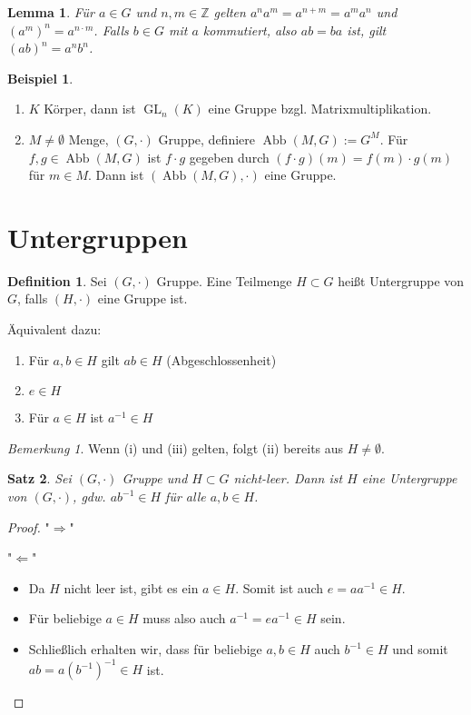 \documentclass[12pt]{scrartcl} %
\DeclareMathOperator{\GL}{GL}
\DeclareMathOperator{\abb}{Abb}
\newcommand{\Inv}[1]{#1^{-1}}
\newtheorem{thm}{Satz}[section]
\newtheorem{lemma}[thm]{Lemma}
\theoremstyle{definition}
\newtheorem*{defn}{Definition}
\newtheorem{ex}{Beispiel}
\theoremstyle{remark}
\newtheorem*{nb}{Bemerkung}
\begin{document}
\begin{lemma}
	Für $a\in G$ und \(n, m \in\mathbb Z\) gelten $a^n a^m=a^{n+m}=a^m a^n$ und $\left(a^m \right)^n = a^{n\cdot m}$.
	Falls \(b \in G\) mit \(a\) kommutiert, also $ab=ba$ ist, gilt $\left(ab \right)^n = a^n b^n$.
\end{lemma}

\begin{ex}
	\begin{enumerate}
	\item $K$ Körper, dann ist $\GL_n(K)$ eine Gruppe bzgl. Matrixmultiplikation.
	\item $M\neq \emptyset$ Menge, $(G, \cdot)$ Gruppe, definiere $\abb(M,G):=G^M$.
		Für $f,g\in \abb(M,G)$ ist $f\cdot g$ gegeben durch $(f\cdot g)(m)=f(m)\cdot g(m)$ für $m\in M$.
		Dann ist $(\abb(M,G), \cdot)$ eine Gruppe.
	\end{enumerate}
\end{ex}

\section{Untergruppen}

\begin{defn}
	Sei $(G, \cdot)$ Gruppe.
	Eine Teilmenge $H\subset G$ heißt Untergruppe von $G$, falls $(H, \cdot)$ eine Gruppe ist.

	Äquivalent dazu:
	\begin{enumerate}[label=(\roman*)]
	\item Für $a,b\in H$ gilt $ab\in H$ (Abgeschlossenheit)
	\item $e\in H$
	\item Für $a\in H$ ist $\Inv a \in H$
	\end{enumerate}
\end{defn}

\begin{nb}
	Wenn (i) und (iii) gelten, folgt (ii) bereits aus \(H \neq \emptyset\).
\end{nb}

\begin{thm}
	Sei $(G, \cdot)$ Gruppe und $H\subset G$ nicht-leer.
	Dann ist $H$ eine Untergruppe von $(G, \cdot)$, gdw. $a\Inv b\in H$ für alle $a,b\in H$.
\end{thm}

\begin{proof}
	"$\Rightarrow$" \checkmark

	"$\Leftarrow$"
	\begin{itemize}
	\item Da \(H\) nicht leer ist, gibt es ein \(a \in H\).
		Somit ist auch $e = aa^{-1}\in H$.
	\item Für beliebige \(a \in H\) muss also auch \(a^{-1} = ea^{-1} \in H\) sein.
	\item Schließlich erhalten wir, dass für beliebige \(a, b \in H\) auch \(b^{-1} \in H\) und somit \(ab = a(b^{-1})^{-1} \in H\) ist. \qedhere
	\end{itemize}
\end{proof}
\end{document}
